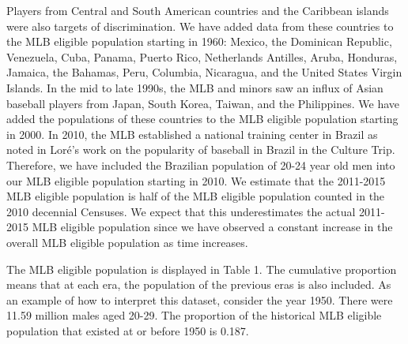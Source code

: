 \documentclass[11pt]{article}\usepackage[]{graphicx}\usepackage[]{color}
\begin{document}
Players from Central and South American countries and the Caribbean islands 
were also targets of discrimination.
We have added data from these countries to the MLB eligible population starting 
in 1960:
Mexico, 
the Dominican Republic, 
Venezuela, 
Cuba, 
Panama, 
Puerto Rico, 
Netherlands Antilles, 
Aruba, 
Honduras, 
Jamaica, 
the Bahamas, 
Peru, 
Columbia, 
Nicaragua, 
and the United States Virgin Islands.  
In the mid to late 1990s, the MLB and minors saw an influx of Asian baseball 
players from Japan, South Korea, Taiwan, and the Philippines.  
We have added the populations of these countries to the MLB eligible population 
starting in 2000.  %
In 2010, the MLB established a national training center in Brazil %
as noted in Lor{\'e}'s work on the popularity of baseball in Brazil in the 
Culture Trip.
Therefore, we have included the Brazilian population of 20-24 year old 
men  
into our MLB eligible population starting in 2010.  
We estimate that the 2011-2015 MLB eligible population is half of the 
MLB eligible population counted in the 2010 decennial Censuses.  We expect 
that this underestimates the actual 2011-2015 MLB eligible population 
since we have observed a constant increase in the overall MLB eligible 
population as time increases. 


The MLB eligible population is displayed in Table 1.
The cumulative proportion means that at each era, the population of the 
previous eras is also included. As an example of how to interpret this 
dataset, consider the year 1950. There were 11.59 
million males aged 20-29. The proportion of the historical MLB eligible 
population that existed at or before 1950 is 0.187. 
\end{document}
